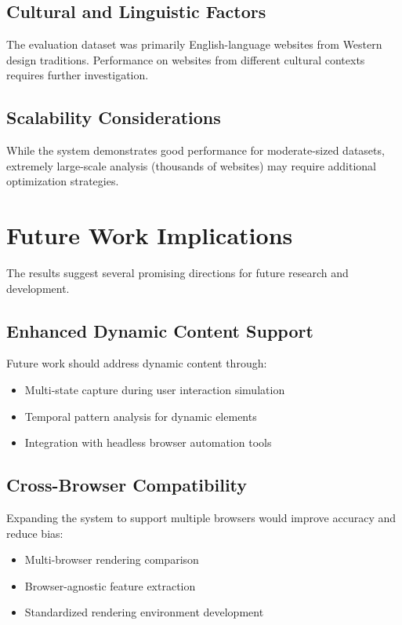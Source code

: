 \subsection{Cultural and Linguistic Factors}
\label{subsec:cultural-factors}

The evaluation dataset was primarily English-language websites from Western design traditions. Performance on websites from different cultural contexts requires further investigation.

\subsection{Scalability Considerations}
\label{subsec:scalability-considerations}

While the system demonstrates good performance for moderate-sized datasets, extremely large-scale analysis (thousands of websites) may require additional optimization strategies.

\section{Future Work Implications}
\label{sec:future-work}

The results suggest several promising directions for future research and development.

\subsection{Enhanced Dynamic Content Support}
\label{subsec:enhanced-dynamic}

Future work should address dynamic content through:
\begin{itemize}
    \item Multi-state capture during user interaction simulation
    \item Temporal pattern analysis for dynamic elements
    \item Integration with headless browser automation tools
\end{itemize}

\subsection{Cross-Browser Compatibility}
\label{subsec:cross-browser}

Expanding the system to support multiple browsers would improve accuracy and reduce bias:
\begin{itemize}
    \item Multi-browser rendering comparison
    \item Browser-agnostic feature extraction
    \item Standardized rendering environment development
\end{itemize}

